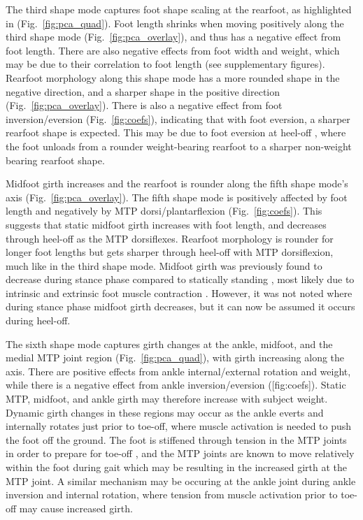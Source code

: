 \documentclass[preprint]{elsarticle}
\begin{document}
The third shape mode captures foot shape scaling at the rearfoot, as highlighted in (Fig.~\ref{fig:pca_quad}).
Foot length shrinks when moving positively along the third shape mode (Fig.~\ref{fig:pca_overlay}), and thus has a negative effect from foot length.
There are also negative effects from foot width and weight, which may be due to their correlation to foot length (see supplementary figures).
Rearfoot morphology along this shape mode has a more rounded shape in the negative direction, and a sharper shape in the positive direction (Fig.~\ref{fig:pca_overlay}).
There is also a negative effect from foot inversion/eversion (Fig.~\ref{fig:coefs}), indicating that with foot eversion, a sharper rearfoot shape is expected.
This may be due to foot eversion at heel-off \citep{Leardini2007}, where the foot unloads from a rounder weight-bearing rearfoot to a sharper non-weight bearing rearfoot shape.

Midfoot girth increases and the rearfoot is rounder along the fifth shape mode's axis (Fig.~\ref{fig:pca_overlay}).
The fifth shape mode is positively affected by foot length and negatively by MTP dorsi/plantarflexion (Fig.~\ref{fig:coefs}).
This suggests that static midfoot girth increases with foot length, and decreases through heel-off as the MTP dorsiflexes.
Rearfoot morphology is rounder for longer foot lengths but gets sharper through heel-off with MTP dorsiflexion, much like in the third shape mode.
Midfoot girth was previously found to decrease during stance phase compared to statically standing \citep{Grau2018}, most likely due to intrinsic and extrinsic foot muscle contraction \citep{Scott1993, Gefen2000}.
However, it was not noted where during stance phase midfoot girth decreases, but it can now be assumed it occurs during heel-off.

The sixth shape mode captures girth changes at the ankle, midfoot, and the medial MTP joint region (Fig.~\ref{fig:pca_quad}), with girth increasing along the axis.
There are positive effects from ankle internal/external rotation and weight, while there is a negative effect from ankle inversion/eversion ({[}fig:coefs{]}).
Static MTP, midfoot, and ankle girth may therefore increase with subject weight.
Dynamic girth changes in these regions may occur as the ankle everts and internally rotates just prior to toe-off, where muscle activation is needed to push the foot off the ground.
The foot is stiffened through tension in the MTP joints in order to prepare for toe-off \citep{Hicks1954}, and the MTP joints are known to move relatively within the foot during gait \citep{Wolf2008, Lundgren2008} which may be resulting in the increased girth at the MTP joint.
A similar mechanism may be occuring at the ankle joint during ankle inversion and internal rotation, where tension from muscle activation prior to toe-off may cause increased girth.
\end{document}
